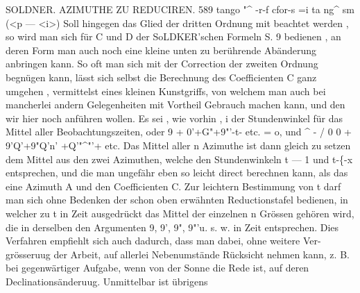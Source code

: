 \documentclass[12pt,a4paper]{article}
\begin{document}
\newpage
SOLDNER. AZIMUTHE ZU REDUCIREN. 589\newline
tango\newline
"\^{}\newline
-r-f cfor-s =i ta ng\^{}\newline
sm (<p --- <i>)\newline
Soll hingegen das Glied der dritten Ordnung mit beachtet werden , so wird man sich für C und D der\newline
SoLDKER'schen Formeln S. 9 bedienen , an deren Form man auch noch eine kleine unten zu berührende\newline
Abänderung anbringen kann.\newline
So oft man sich mit der Correction der zweiten Ordnung begnügen kann, lässt sich selbst die\newline
Berechnung des Coefficienten C ganz umgehen , vermittelst eines kleinen Kunstgriffs, von welchem man\newline
auch bei mancherlei andern Gelegenheiten mit Vortheil Gebrauch machen kann, und den wir hier noch\newline
anführen wollen. Es sei , wie vorhin , i der Stundenwinkel für das Mittel aller Beobachtungszeiten,\newline
oder 9 + 0'+G"+9"'-t- etc. = o, und\newline
\^{} - / 0 0 + 9'Q'+9"Q'n' +Q'"\^{}"'+ etc.\newline
Das Mittel aller n Azimuthe ist dann gleich zu setzen dem Mittel aus den zwei Azimuthen, welche den\newline
Stundenwinkeln t --- 1 und t-\{-x entsprechen, und die man ungefähr eben so leicht direct berechnen kann,\newline
als das eine Azimuth A und den Coefficienten C. Zur leichtern Bestimmung von t darf man sich ohne\newline
Bedenken der schon oben erwähnten Reductionstafel bedienen, in welcher zu t in Zeit ausgedrückt das\newline
Mittel der einzelnen n Grössen gehören wird, die in derselben den Argumenten 9, 9', 9", 9"'u. s. w.\newline
in Zeit entsprechen. Dies Verfahren empfiehlt sich auch dadurch, dass man dabei, ohne weitere Ver-\newline
grösseruug der Arbeit, auf allerlei Nebenumstände Rücksicht nehmen kann, z. B. bei gegenwärtiger\newline
Aufgabe, wenn von der Sonne die Rede ist, auf deren Declinationsänderuug. Unmittelbar ist übrigens\newline
\end{document}

